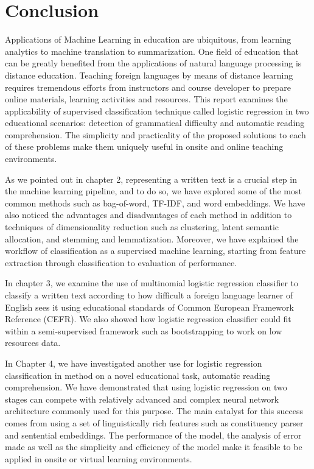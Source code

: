 
\chapter{Conclusion} %

\label{Chapter5} %

Applications of Machine Learning in education are ubiquitous, from learning analytics to machine translation to summarization. One field of education that can be greatly benefited from the applications of natural language processing is distance education. Teaching foreign languages by means of distance learning requires tremendous efforts from instructors and course developer to prepare online materials, learning activities and resources.   This report examines the applicability of supervised classification technique called logistic regression in two educational scenarios: detection of grammatical difficulty and automatic reading comprehension. The simplicity and practicality of the proposed solutions to each of these problems make them uniquely useful in onsite and online teaching environments. 

As we pointed out in chapter 2, representing a written text is a crucial step in the machine learning pipeline, and to do so, we have explored some of the most common methods such as bag-of-word, TF-IDF, and word embeddings.  We have also noticed the advantages and disadvantages of each method in addition to techniques of dimensionality reduction such as clustering, latent semantic allocation, and stemming and lemmatization. Moreover, we have explained the workflow of classification as a supervised machine learning, starting from feature extraction through classification to evaluation of performance. 

In chapter 3, we examine the use of multinomial logistic regression classifier to classify a written text according to how difficult a foreign language learner of English sees it using educational standards of Common European Framework Reference (CEFR). We also showed how logistic regression classifier could fit within a semi-supervised framework such as bootstrapping to work on low resources data. 

In Chapter 4, we have investigated another use for logistic regression classification in method on a novel educational task, automatic reading comprehension. We have demonstrated that using logistic regression on two stages can compete with relatively advanced and complex neural network architecture commonly used for this purpose. The main catalyst for this success comes from using a set of linguistically rich features such as constituency parser and sentential embeddings. The performance of the model, the analysis of error made as well as the simplicity and efficiency of the model make it feasible to be applied in onsite or virtual learning environments.


